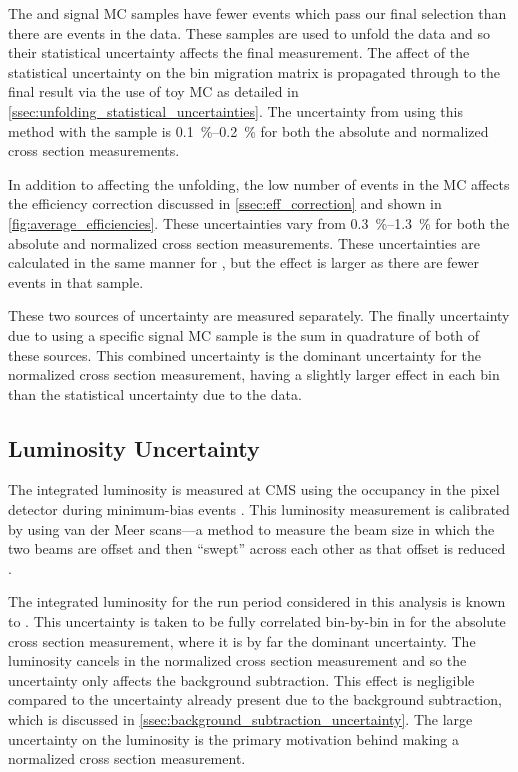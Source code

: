 The \MADGRAPH and \POWHEG signal MC samples have fewer events which pass our
final selection than there are events in the data. These samples are used to
unfold the data and so their statistical uncertainty affects the final
measurement. The affect of the statistical uncertainty on the bin migration
matrix is propagated through to the final result via the use of toy MC as
detailed in \cref{ssec:unfolding_statistical_uncertainties}. The uncertainty
from using this method with the \MADGRAPH sample is
\SIrange{0.1}{0.2}{\percent} for both the absolute and normalized cross section
measurements.

In addition to affecting the unfolding, the low number of events in the MC
affects the efficiency correction discussed in \cref{ssec:eff_correction} and
shown in \cref{fig:average_efficiencies}. These uncertainties vary from
\SIrange{0.3}{1.3}{\percent} for both the absolute and normalized cross section
measurements. These uncertainties are calculated in the same manner for
\POWHEG, but the effect is larger as there are fewer events in that sample.

These two sources of uncertainty are measured separately. The finally
uncertainty due to using a specific signal MC sample is the sum in quadrature
of both of these sources. This combined uncertainty is the dominant uncertainty
for the normalized cross section measurement, having a slightly larger effect
in each \phistar bin than the statistical uncertainty due to the data.

\subsection{Luminosity Uncertainty}
\label{ssec:lumi_uncertainty}

The integrated luminosity is measured at CMS using the occupancy in the pixel
detector during minimum-bias events \cite{cms_lumi_2013}. This luminosity
measurement is calibrated by using van der Meer scans---a method to measure the
beam size in which the two beams are offset and then ``swept'' across each
other as that offset is reduced \cite{vandermeer_1968}.

The integrated luminosity for the run period considered in this analysis is
known to \LumiUncertainty. This uncertainty is taken to be fully correlated
bin-by-bin in \phistar for the absolute cross section measurement, where it is
by far the dominant uncertainty. The luminosity cancels in the normalized
cross section measurement and so the uncertainty only affects the background
subtraction. This effect is negligible compared to the uncertainty already
present due to the background subtraction, which is discussed in
\cref{ssec:background_subtraction_uncertainty}. The large uncertainty on
the luminosity is the primary motivation behind making a normalized cross
section measurement.

